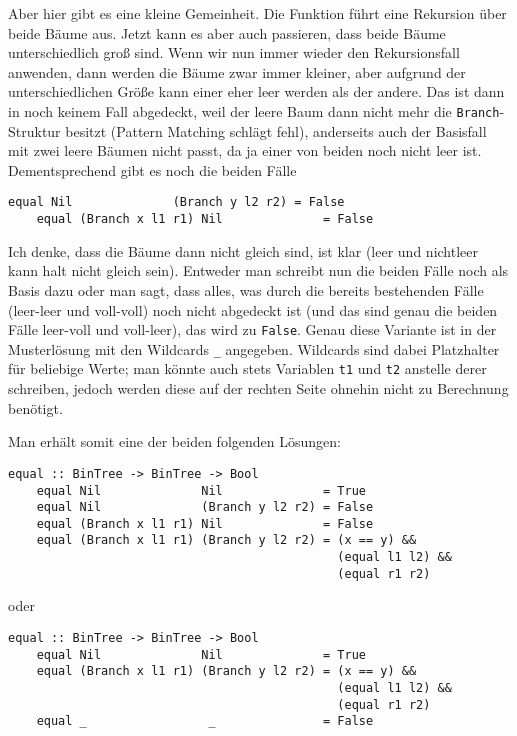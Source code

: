 \documentclass[ngerman, a4paper, 11pt]{article}
\theoremstyle{nonumberplain}
\begin{document}
Aber hier gibt es eine kleine Gemeinheit. Die Funktion führt eine Rekursion über beide Bäume aus. Jetzt kann es aber auch passieren, dass beide Bäume unterschiedlich groß sind. Wenn wir nun immer wieder den Rekursionsfall anwenden, dann werden die Bäume zwar immer kleiner, aber aufgrund der unterschiedlichen Größe kann einer eher leer werden als der andere. Das ist dann in noch keinem Fall abgedeckt, weil der leere Baum dann nicht mehr die \texttt{Branch}-Struktur besitzt (Pattern Matching schlägt fehl), anderseits auch der Basisfall mit zwei leere Bäumen nicht passt, da ja einer von beiden noch nicht leer ist. Dementsprechend gibt es noch die beiden Fälle
\begin{lstlisting}[style=noframe]
	equal Nil              (Branch y l2 r2) = False
	equal (Branch x l1 r1) Nil              = False
\end{lstlisting}
Ich denke, dass die Bäume dann nicht gleich sind, ist klar (leer und nichtleer kann halt nicht gleich sein). Entweder man schreibt nun die beiden Fälle noch als Basis dazu oder man sagt, dass alles, was durch die bereits bestehenden Fälle (leer-leer und voll-voll) noch nicht abgedeckt ist (und das sind genau die beiden Fälle leer-voll und voll-leer), das wird zu \texttt{False}. Genau diese Variante ist in der Musterlösung mit den Wildcards \lstinline[style=noframe]|_| angegeben. Wildcards sind dabei Platzhalter für beliebige Werte; man könnte auch stets Variablen \texttt{t1} und \texttt{t2} anstelle derer schreiben, jedoch werden diese auf der rechten Seite ohnehin nicht zu Berechnung benötigt.

Man erhält somit eine der beiden folgenden Lösungen:
\begin{lstlisting}[style=frame]
	equal :: BinTree -> BinTree -> Bool
	equal Nil              Nil              = True
	equal Nil              (Branch y l2 r2) = False
	equal (Branch x l1 r1) Nil              = False
	equal (Branch x l1 r1) (Branch y l2 r2) = (x == y) && 
	                                          (equal l1 l2) && 
	                                          (equal r1 r2)
\end{lstlisting}
oder
\begin{lstlisting}[style=frame]
	equal :: BinTree -> BinTree -> Bool
	equal Nil              Nil              = True
	equal (Branch x l1 r1) (Branch y l2 r2) = (x == y) && 
	                                          (equal l1 l2) && 
	                                          (equal r1 r2)
	equal _                 _               = False
\end{lstlisting}
\end{document}
